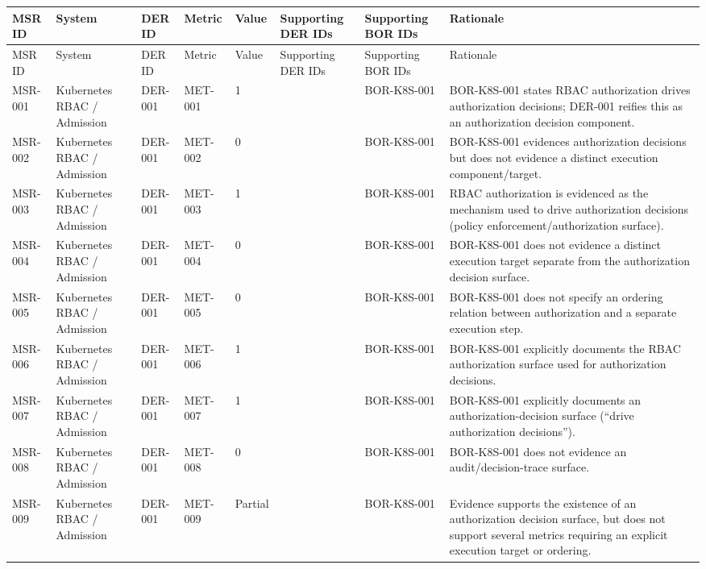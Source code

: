 \documentclass{article}
\begin{document}
\begin{longtable}{@{}p{}p{}p{}p{}p{}p{}p{}p{}@{}}
\toprule
MSR ID & System & DER ID & Metric & Value & Supporting DER IDs & Supporting BOR IDs & Rationale\\
\midrule
\endfirsthead
\toprule
MSR ID & System & DER ID & Metric & Value & Supporting DER IDs & Supporting BOR IDs & Rationale\\
\midrule
\endhead
MSR-001 & Kubernetes RBAC / Admission & DER-001 & MET-001 & 1 &  & BOR-K8S-001 & BOR-K8S-001 states RBAC authorization drives authorization decisions; DER-001 reifies this as an authorization decision component.\\
MSR-002 & Kubernetes RBAC / Admission & DER-001 & MET-002 & 0 &  & BOR-K8S-001 & BOR-K8S-001 evidences authorization decisions but does not evidence a distinct execution component/target.\\
MSR-003 & Kubernetes RBAC / Admission & DER-001 & MET-003 & 1 &  & BOR-K8S-001 & RBAC authorization is evidenced as the mechanism used to drive authorization decisions (policy enforcement/authorization surface).\\
MSR-004 & Kubernetes RBAC / Admission & DER-001 & MET-004 & 0 &  & BOR-K8S-001 & BOR-K8S-001 does not evidence a distinct execution target separate from the authorization decision surface.\\
MSR-005 & Kubernetes RBAC / Admission & DER-001 & MET-005 & 0 &  & BOR-K8S-001 & BOR-K8S-001 does not specify an ordering relation between authorization and a separate execution step.\\
MSR-006 & Kubernetes RBAC / Admission & DER-001 & MET-006 & 1 &  & BOR-K8S-001 & BOR-K8S-001 explicitly documents the RBAC authorization surface used for authorization decisions.\\
MSR-007 & Kubernetes RBAC / Admission & DER-001 & MET-007 & 1 &  & BOR-K8S-001 & BOR-K8S-001 explicitly documents an authorization-decision surface (``drive authorization decisions'').\\
MSR-008 & Kubernetes RBAC / Admission & DER-001 & MET-008 & 0 &  & BOR-K8S-001 & BOR-K8S-001 does not evidence an audit/decision-trace surface.\\
MSR-009 & Kubernetes RBAC / Admission & DER-001 & MET-009 & Partial &  & BOR-K8S-001 & Evidence supports the existence of an authorization decision surface, but does not support several metrics requiring an explicit execution target or ordering.\\


\end{longtable}
\end{document}
